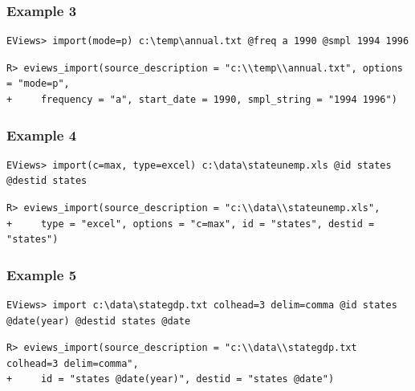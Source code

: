 \hypertarget{example-3-1}{%
\subsubsection{Example 3}\label{example-3-1}}

\begin{verbatim}
EViews> import(mode=p) c:\temp\annual.txt @freq a 1990 @smpl 1994 1996
\end{verbatim}

\begin{verbatim}
R> eviews_import(source_description = "c:\\temp\\annual.txt", options = "mode=p",
+     frequency = "a", start_date = 1990, smpl_string = "1994 1996")
\end{verbatim}

\hypertarget{example-4-1}{%
\subsubsection{Example 4}\label{example-4-1}}

\begin{verbatim}
EViews> import(c=max, type=excel) c:\data\stateunemp.xls @id states @destid states
\end{verbatim}

\begin{verbatim}
R> eviews_import(source_description = "c:\\data\\stateunemp.xls",
+     type = "excel", options = "c=max", id = "states", destid = "states")
\end{verbatim}

\hypertarget{example-5-1}{%
\subsubsection{Example 5}\label{example-5-1}}

\begin{verbatim}
EViews> import c:\data\stategdp.txt colhead=3 delim=comma @id states @date(year) @destid states @date
\end{verbatim}

\begin{verbatim}
R> eviews_import(source_description = "c:\\data\\stategdp.txt colhead=3 delim=comma",
+     id = "states @date(year)", destid = "states @date")
\end{verbatim}

